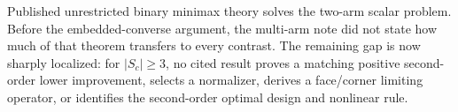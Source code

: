 Published unrestricted binary minimax theory solves the two-arm scalar problem.  Before the embedded-converse argument, the multi-arm note did not state how much of that theorem transfers to every contrast.  The remaining gap is now sharply localized: for \(|S_c|\geq3\), no cited result proves a matching positive second-order lower improvement, selects a normalizer, derives a face/corner limiting operator, or identifies the second-order optimal design and nonlinear rule.